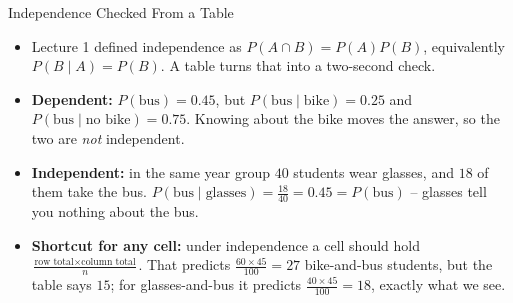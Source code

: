 \begin{frame}{Independence Checked From a Table}
\begin{itemize}
  \item Lecture 1 defined independence as $P(A \cap B) = P(A)P(B)$, equivalently $P(B \mid A) = P(B)$. A table turns that into a two-second check.
  \pause
  \item \textbf{Dependent:} $P(\text{bus}) = 0.45$, but $P(\text{bus} \mid \text{bike}) = 0.25$ and $P(\text{bus} \mid \text{no bike}) = 0.75$. Knowing about the bike moves the answer, so the two are \emph{not} independent.
  \pause
  \item \textbf{Independent:} in the same year group $40$ students wear glasses, and $18$ of them take the bus. $P(\text{bus} \mid \text{glasses}) = \tfrac{18}{40} = 0.45 = P(\text{bus})$ -- glasses tell you nothing about the bus.
  \pause
  \item \textbf{Shortcut for any cell:} under independence a cell should hold $\frac{\text{row total} \times \text{column total}}{n}$. That predicts $\frac{60 \times 45}{100} = 27$ bike-and-bus students, but the table says $15$; for glasses-and-bus it predicts $\frac{40 \times 45}{100} = 18$, exactly what we see.
\end{itemize}
\end{frame}

